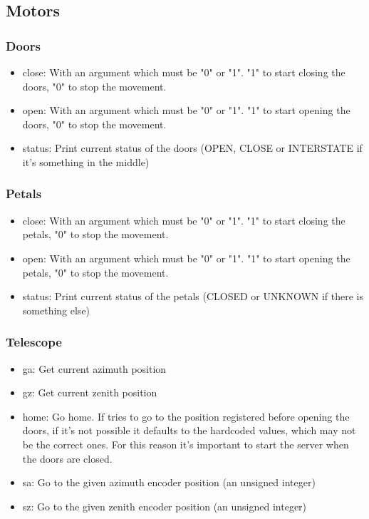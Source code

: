 \documentclass[letterpaper, 10 pt]{article}
\begin{document}
\subsection{Motors}
\subsubsection{Doors}
\begin{itemize}
	\item close: With an argument which must be "0" or "1". "1" to start closing the doors, "0" to stop the movement.
	\item open: With an argument which must be "0" or "1". "1" to start opening the doors, "0" to stop the movement.
	\item status: Print current status of the doors (OPEN, CLOSE or INTERSTATE if it's something in the middle)
\end{itemize}
\subsubsection{Petals}
\begin{itemize}
	\item close: With an argument which must be "0" or "1". "1" to start closing the petals, "0" to stop the movement.
	\item open: With an argument which must be "0" or "1". "1" to start opening the petals, "0" to stop the movement.
	\item status: Print current status of the petals (CLOSED or UNKNOWN if there is something else)
\end{itemize}
\subsubsection{Telescope}
\begin{itemize}
	\item ga: Get current azimuth position
	\item gz: Get current zenith position
	\item home: Go home. If tries to go to the position registered before opening the doors, if it's not possible it defaults to the hardcoded values, which may not be the correct ones. For this reason it's important to start the server when the doors are closed.
	\item sa: Go to the given azimuth encoder position (an unsigned integer)
	\item sz: Go to the given zenith encoder position (an unsigned integer)
\end{itemize}
\end{document}
